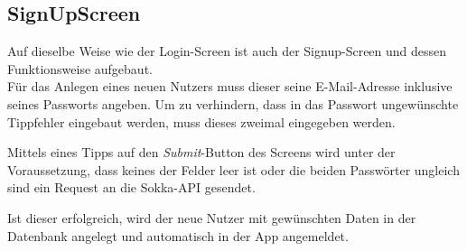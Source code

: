 \subsection{SignUpScreen}

Auf dieselbe Weise wie der Login-Screen ist auch der Signup-Screen und dessen Funktionsweise
aufgebaut.\\
Für das Anlegen eines neuen Nutzers muss dieser seine E-Mail-Adresse inklusive seines Passworts
angeben. Um zu verhindern, dass in das Passwort ungewünschte Tippfehler eingebaut werden, muss dieses
zweimal eingegeben werden.

Mittels eines Tipps auf den \textit{Submit}-Button des Screens wird unter der Voraussetzung, dass
keines der Felder leer ist oder die beiden Passwörter ungleich sind ein Request an die Sokka-API
gesendet.

Ist dieser erfolgreich, wird der neue Nutzer mit gewünschten Daten in der Datenbank angelegt und
automatisch in der App angemeldet.